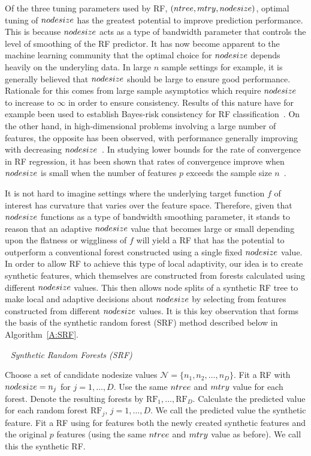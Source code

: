 \documentclass{bmcart}
\def\mtry{{\sl mtry }}
\def\ntree{{\sl ntree }}
\def\nodesize{{\sl nodesize }}
\def\RF{\textrm{RF}}
\def\RSFS{\mathscr}
\def\nn{{\RSFS N}}
\begin{document}
Of the three tuning parameters used by RF, $(\ntree, \mtry,
\nodesize)$, optimal tuning of $\nodesize$ has the greatest potential
to improve prediction performance.  This is because $\nodesize$ acts
as a type of bandwidth parameter that controls the level of smoothing
of the RF predictor.  It has now become apparent to the machine
learning community that the optimal choice for $\nodesize$ depends
heavily on the underyling data.  In large $n$ sample settings for
example, it is generally believed that $\nodesize$ should be large to
ensure good performance.  Rationale for this comes from large sample
asymptotics which require $\nodesize$ to increase to $\infty$ in order
to ensure consistency.  Results of this nature have for example
been used to establish Bayes-risk consistency for RF
classification~\cite{Biau:Devroye:Lugosi:2008}.  On the other hand, in
high-dimensional problems involving a large number of features, the
opposite has been observed, with performance generally improving with
decreasing $\nodesize$~\cite{ishwaran:2011}.  In studying lower bounds
for the rate of convergence in RF regression, it has been shown that
rates of convergence improve when $\nodesize$ is small when the number
of features $p$ exceeds the sample size $n$~\cite{lin:jeon:2006}.

It is not hard to imagine settings where the underlying target
function $f$ of interest has curvature that varies over the feature
space.  Therefore, given that $\nodesize$ functions as a type of
bandwidth smoothing parameter, it stands to reason that an adaptive
$\nodesize$ value that becomes large or small depending upon the
flatness or wiggliness of $f$ will yield a RF that has the potential
to outperform a conventional forest constructed using a single fixed
$\nodesize$ value.  In order to allow RF to achieve this type of local
adaptivity, our idea is to create synthetic features, which themselves
are constructed from forests calculated using different $\nodesize$
values.  This then allows node splits of a synthetic RF tree to make
local and adaptive decisions about $\nodesize$ by selecting from
features constructed from different $\nodesize$ values.  It is this
key observation that forms the basis of the synthetic random forest
(SRF) method described below in Algorithm~\ref{A:SRF}.

\vskip6pt
\begin{algorithm}[pht]
\centering
\caption{\em\,\, Synthetic Random Forests (SRF)}\label{A:SRF}
\begin{algorithmic}[1]
\STATE Choose a set of candidate nodesize values $\nn=\{n_1,n_2,\ldots,n_D\}$.
\STATE Fit a RF with $\nodesize=n_j$ for $j=1,\ldots,D$.  Use the same
$\ntree$ and $\mtry$ value for each forest.  Denote the
resulting forests by $\RF_1,\ldots,\RF_D$.
\STATE Calculate the predicted value for each random forest $\RF_j$,
$j=1,\ldots,D$.  We call the predicted value the synthetic feature.
\STATE Fit a RF using for features both
 the newly created synthetic features and the
original $p$ features (using the same $\ntree$ and $\mtry$ value as
before).  We call this the synthetic RF.
\end{algorithmic}
\end{algorithm}
\end{document}
